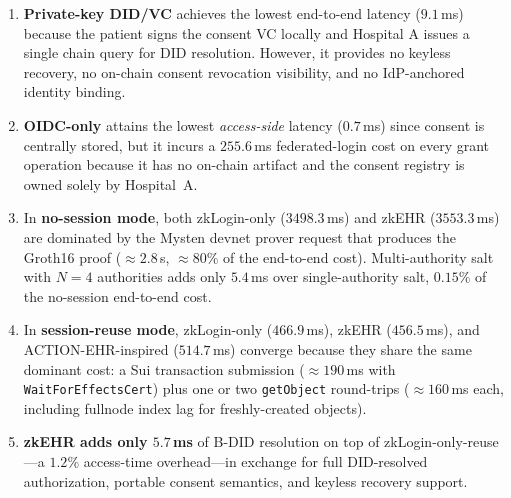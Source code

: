 \begin{enumerate}
\item \textbf{Private-key DID/VC} achieves the lowest end-to-end
latency ($9.1$\,ms) because the patient signs the consent VC locally
and Hospital A issues a single chain query for DID resolution. However,
it provides no keyless recovery, no on-chain consent revocation
visibility, and no IdP-anchored identity binding.

\item \textbf{OIDC-only} attains the lowest \textit{access-side}
latency ($0.7$\,ms) since consent is centrally stored, but it incurs a
$255.6$\,ms federated-login cost on every grant operation because it
has no on-chain artifact and the consent registry is owned solely by
Hospital~A.

\item In \textbf{no-session mode}, both zkLogin-only ($3498.3$\,ms) and
zkEHR ($3553.3$\,ms) are dominated by the Mysten devnet prover request
that produces the Groth16 proof ($\approx$$2.8$\,s, $\approx$$80\%$ of
the end-to-end cost). Multi-authority salt with $N{=}4$ authorities
adds only $5.4$\,ms over single-authority salt, $0.15\%$ of the
no-session end-to-end cost.

\item In \textbf{session-reuse mode}, zkLogin-only ($466.9$\,ms),
zkEHR ($456.5$\,ms), and ACTION-EHR-inspired ($514.7$\,ms) converge
because they share the same dominant cost: a Sui transaction
submission ($\approx$$190$\,ms with \texttt{WaitForEffectsCert}) plus
one or two \texttt{getObject} round-trips ($\approx$$160$\,ms each,
including fullnode index lag for freshly-created objects).

\item \textbf{zkEHR adds only $5.7$\,ms} of B-DID resolution on top of
zkLogin-only-reuse---a $1.2\%$ access-time overhead---in exchange for
full DID-resolved authorization, portable consent semantics, and
keyless recovery support.
\end{enumerate}

